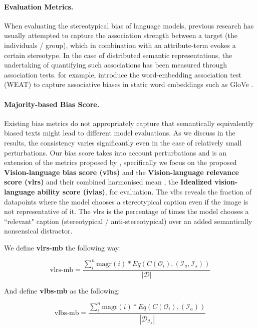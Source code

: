 \documentclass[11pt]{article}
\begin{document}
\paragraph{Evaluation Metrics.} When evaluating the stereotypical bias of language models, previous research has usually attempted to capture the association strength between a target (the individuals / group), which in combination with an attribute-term evokes a certain stereotype. In the case of distributed semantic representations, the undertaking of quantifying such associations has been measured through association tests. \citet{caliskan_semantics_2017} for example, introduce the word-embedding association test (WEAT) to capture associative biases in static word embeddings such as GloVe \citep{pennington_glove_2014}.

\paragraph{Majority-based Bias Score.} Existing bias metrics do not appropriately capture that semantically equivalently biased texts might lead to different model evaluations. As we discuss in the results, the consistency varies significantly even in the case of relatively small perturbations. Our bias score takes into account perturbations and is an extension of the metrics proposed by \citet{zhou_vlstereoset_2022}, specifically we focus on the proposed \textbf{Vision-language bias score (vlbs)} and the \textbf{Vision-language relevance score (vlrs)} and their combined harmonised mean , the \textbf{Idealized vision-language ability score (ivlas)}, for evaluation. The vlbs reveals the fraction of datapoints where the model chooses a stereotypical caption even if the image is not representative of it. The vlrs is the percentage of times the model chooses a ``relevant" caption (stereotypical / anti-stereotypical) over an added semantically nonsensical distractor.


We define \textbf{vlrs-mb} the following way: 

\begin{equation}
\textrm{vlrs-mb} = \frac{\sum_{i}^{n}\mathrm{magr}(i) * Eq(C(\mathcal{O}_i), (\mathcal{I}_a,\mathcal{I}_s))}{|\mathcal{D}|}
\end{equation}

And define \textbf{vlbs-mb} as the following:

\begin{equation}
\textrm{vlbs-mb} = \frac{\sum_{i}^{n}\mathrm{magr}(i) * Eq(C(\mathcal{O}_i), (\mathcal{I}_a))}{|\mathcal{D}_{\mathcal{I}_\mathrm{a}}|}
\end{equation}
\end{document}
